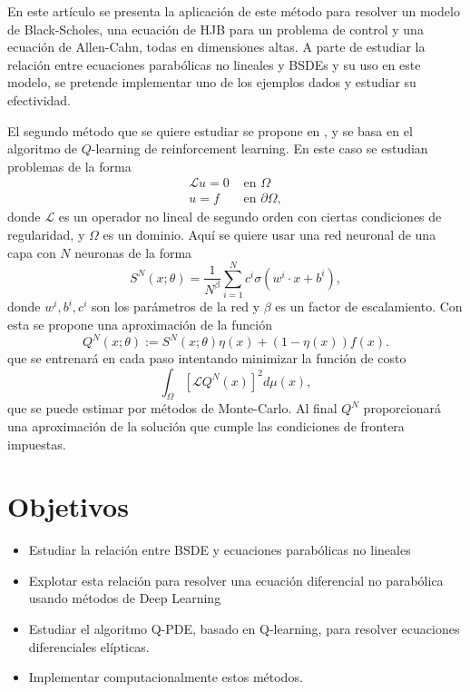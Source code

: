 \documentclass[a4paper,11pt]{scrartcl}
\begin{document}
En este artículo se presenta la aplicación de este método para resolver un modelo de Black-Scholes, una ecuación de HJB para un problema de control y una ecuación de Allen-Cahn, todas en dimensiones altas. A parte de estudiar la relación entre ecuaciones parabólicas no lineales y BSDEs y su uso en este modelo, se pretende implementar uno de los ejemplos dados y estudiar su efectividad.

El segundo método que se quiere estudiar se propone en , y se basa en el algoritmo de $Q$-learning de reinforcement learning. En este caso se estudian problemas de la forma
\begin{equation}
	\begin{aligned}
		\mathcal{L} u=0 & \text { en } \Omega \\
		u=f & \text { en } \partial \Omega,
	\end{aligned}
\end{equation}
donde $\mathcal{L}$ es un operador no lineal de segundo orden con ciertas condiciones de regularidad, y $\Omega$ es un dominio.  Aquí se quiere usar una red neuronal de una capa con $N$ neuronas de la forma
\begin{equation}
	S^N(x ; \theta)=\frac{1}{N^\beta} \sum_{i=1}^N c^i \sigma\left(w^i \cdot x+b^i\right),
\end{equation}
donde $w^i,b^i,c^i$ son los parámetros de la red y $\beta$ es un factor de escalamiento. Con esta se propone una aproximación de la función  
\begin{equation}
	Q^N(x ; \theta):=S^N(x ; \theta) \eta(x)+(1-\eta(x)) f(x) .
\end{equation}
que se entrenará en cada paso intentando minimizar la función de costo 
\begin{equation}
	\int_{\Omega}\left[\mathcal{L} Q^N(x)\right]^2 d \mu(x),
\end{equation}
que se puede estimar por métodos de Monte-Carlo. Al final $Q^N$ proporcionará una aproximación de la solución que cumple las condiciones de frontera impuestas.
\section{Objetivos}
\begin{itemize}
	\item Estudiar la relación entre BSDE y ecuaciones parabólicas no lineales
	\item Explotar esta relación para resolver una ecuación diferencial no parabólica usando métodos de Deep Learning
	\item Estudiar el algoritmo Q-PDE, basado en Q-learning, para resolver ecuaciones diferenciales elípticas.
	\item Implementar computacionalmente estos métodos. 
\end{itemize}
\end{document}
